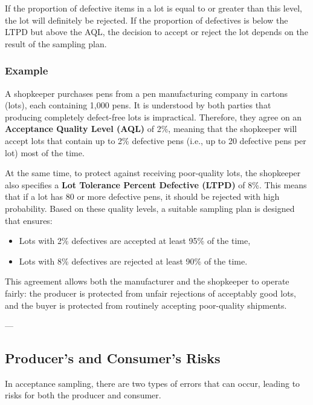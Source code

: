 \documentclass[twoside]{book}
\begin{document}
If the proportion of defective items in a lot is equal to or greater than this level, the lot will definitely be rejected. If the proportion of defectives is below the LTPD but above the AQL, the decision to accept or reject the lot depends on the result of the sampling plan.

\subsubsection*{Example}

A shopkeeper purchases pens from a pen manufacturing company in cartons (lots), each containing 1,000 pens. It is understood by both parties that producing completely defect-free lots is impractical. Therefore, they agree on an \textbf{Acceptance Quality Level (AQL)} of 2\%, meaning that the shopkeeper will accept lots that contain up to 2\% defective pens (i.e., up to 20 defective pens per lot) most of the time.

At the same time, to protect against receiving poor-quality lots, the shopkeeper also specifies a \textbf{Lot Tolerance Percent Defective (LTPD)} of 8\%. This means that if a lot has 80 or more defective pens, it should be rejected with high probability. Based on these quality levels, a suitable sampling plan is designed that ensures:
\begin{itemize}
  \item Lots with 2\% defectives are accepted at least 95\% of the time,
  \item Lots with 8\% defectives are rejected at least 90\% of the time.
\end{itemize}

This agreement allows both the manufacturer and the shopkeeper to operate fairly: the producer is protected from unfair rejections of acceptably good lots, and the buyer is protected from routinely accepting poor-quality shipments.

---

\subsection{Producer's and Consumer's Risks}

In acceptance sampling, there are two types of errors that can occur, leading to risks for both the producer and consumer.
\end{document}
